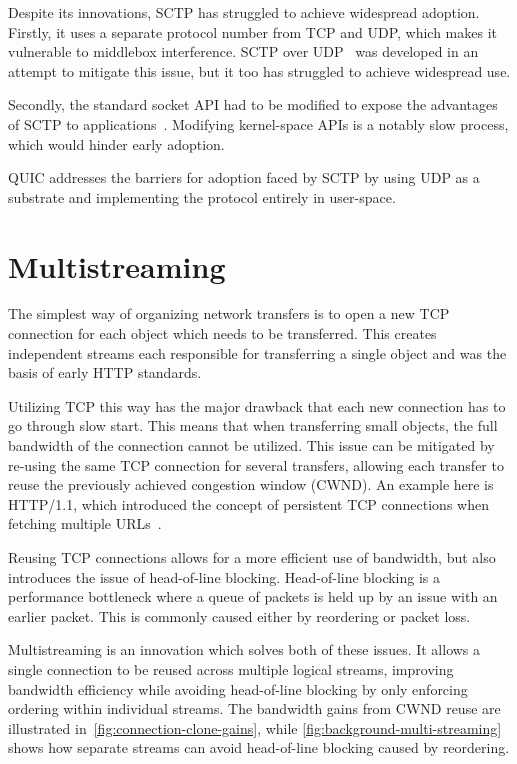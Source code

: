 Despite its innovations, SCTP has struggled to achieve widespread adoption.
Firstly, it uses a separate protocol number from TCP and UDP, which
makes it vulnerable to middlebox interference.
SCTP over UDP~\cite{rfc6951} was developed in an attempt to mitigate this issue, but
it too has struggled to achieve widespread use.

Secondly, the standard socket API had to be modified to
expose the advantages of SCTP to applications~\cite{sctpstruggles}.
Modifying kernel-space APIs is a notably slow process,
which would hinder early adoption.

QUIC addresses the barriers for adoption faced by SCTP by using UDP as 
a substrate and implementing the protocol entirely in user-space.

\section{Multistreaming}\label{sec:background-multistreaming}
The simplest way of organizing network transfers is to open
a new TCP connection for each object which needs to be transferred.
This creates independent streams each responsible for transferring
a single object and was the basis of early HTTP standards.

Utilizing TCP this way has the major drawback that each new
connection has to go through slow start. This means that
when transferring small objects, the full bandwidth of the
connection cannot be utilized.
This issue can be mitigated by re-using the same
TCP connection for several transfers, allowing
each transfer to reuse the previously achieved congestion window (CWND). An example
here is HTTP/1.1,
which introduced the concept of persistent
TCP connections when fetching multiple URLs~\cite[sec.~8.1]{rfc2616}.

Reusing TCP connections allows for a more
efficient use of bandwidth, but also introduces the issue of
head-of-line blocking. Head-of-line blocking is a performance bottleneck where a queue of packets
is held up by an issue with an earlier packet. This is commonly caused
either by reordering or packet loss.

Multistreaming is an innovation which solves both of these issues.
It allows a single connection to be reused across multiple logical streams,
improving bandwidth efficiency while avoiding head-of-line blocking by
only enforcing ordering within individual streams.
The bandwidth gains from CWND reuse are illustrated in~\cref{fig:connection-clone-gains},
while \cref{fig:background-multi-streaming} shows how separate streams can avoid
head-of-line blocking caused by reordering.



